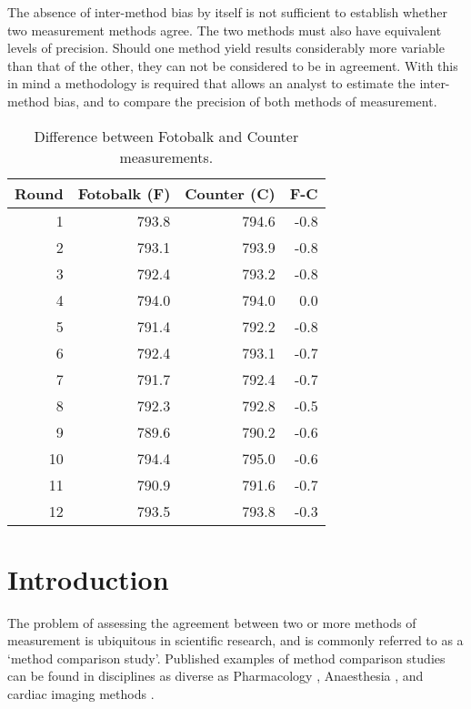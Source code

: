 \documentclass[12pt, a4paper]{report}
\begin{document}
The absence of inter-method bias by itself is not sufficient to
establish whether two measurement methods agree. The two
methods must also have equivalent levels of precision. Should one
method yield results considerably more variable than that of the
other, they can not be considered to be in agreement. With this in
mind a methodology is required that allows an analyst to estimate
the inter-method bias, and to compare the precision of both
methods of measurement.
\newpage
\begin{table}[h!]
	
	\begin{center}
		
		\begin{tabular}{rrrr}
			\hline
			Round& Fotobalk (F) & Counter (C) & F-C \\
			\hline
			1 & 793.8& 794.6 & -0.8 \\
			2 & 793.1 & 793.9 & -0.8 \\
			3 & 792.4 & 793.2 & -0.8 \\
			4 & 794.0 & 794.0 & 0.0 \\
			5 & 791.4 & 792.2 & -0.8 \\
			6 & 792.4 & 793.1 & -0.7 \\
			7 & 791.7 & 792.4 & -0.7 \\
			8 & 792.3 & 792.8 & -0.5 \\
			9 & 789.6 & 790.2 & -0.6 \\
			10 & 794.4 & 795.0 & -0.6 \\
			11 & 790.9 & 791.6 & -0.7 \\
			12 & 793.5 & 793.8 & -0.3 \\
			\hline
		\end{tabular}
		\caption{Difference between Fotobalk and Counter measurements.}
	\end{center}
\end{table}

\bigskip


\section{Introduction}
The problem of assessing the agreement between two or more methods
of measurement is ubiquitous in scientific research, and is
commonly referred to as a `method comparison study'. Published
examples of method comparison studies can be found in disciplines
as diverse as Pharmacology \citep{ludbrook97}, Anaesthesia
\citep{Myles}, and cardiac imaging methods \citep{Krumm}.
\smallskip
\end{document}

